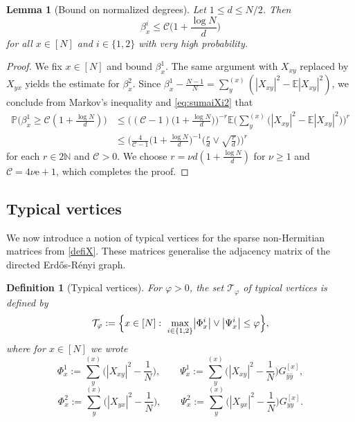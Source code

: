 \documentclass[10pt,a4paper]{amsart}
\newcommand{\ee}{\mathrm{e}}
\newcommand{\abs}[1]{\left| #1 \right|}
\newcommand{\absb}[1]{\bigl| #1 \bigr|}
\newcommand{\N}{\mathbb{N}}
\newtheorem{lemma}{Lemma}[section]
\newtheorem{defi}{Definition}[section]
\numberwithin{equation}{section}
\newcommand*\bset[1]{[#1]}
\newcommand*\ubarr[1]{{\widehat{#1}}}
\begin{document}
	\begin{lemma}[Bound on normalized degrees] \label{lem:roughboundonbetaix}
	Let $1 \leq d \leq N/2$. Then 
		\begin{equation*}
			\beta_{x}^i \le \mathcal C \biggl( 1 + \frac{\log N}{d}\biggr)
		\end{equation*}
		for all $x \in [N]$ and $i \in \{1,2\}$ with very high probability. 
	\end{lemma}
	\begin{proof}
		We fix $x \in [N]$ and bound $\beta_x^1$. The same argument with $X_{xy}$ replaced by $X_{yx}$ yields the estimate for $\beta_x^2$. 
		Since $\beta_{x}^1 - \frac{N-1}{N} = \sum_{y}^{(x)}(\abs{X_{xy}}^2 - \mathbb{E}\abs{X_{xy}}^2)$, we conclude from Markov's inequality and \cref{eq:sumaiXi2} that
		\begin{align*}
			\mathbb{P}\biggl( \beta_x^1  \ge \mathcal{C}\left(1+ \frac{\log N}{d} \right)\biggr) &\le \biggl((\mathcal{C}-1) \biggl( 1 + \frac{\log N}{d} \biggr)\biggr)^{-r} \mathbb{E}\biggl(\sum_{y}^{(x)} \bigl(\abs{X_{xy}}^2 - \mathbb{E}\abs{X_{xy}}^2\bigr) \biggr)^r \\
			&\le  \biggl(\frac{4}{\mathcal{C}-1} \biggl( 1 + \frac{\log N}{d} \biggr)^{-1} \biggl( \frac{r}{d} \vee \sqrt{\frac{r}{d}} \biggr)\biggr)^r
		\end{align*}
		for each $r \in 2\N$ and $\mathcal C >0$. 
		We choose $r = \nu d (1 + \frac{\log N}{d})$ for $\nu \geq 1$ and $\mathcal C =4 \nu \ee + 1$, which completes the proof. 
	\end{proof}
	
	
	\subsection{Typical vertices} 
	\label{sec:typical_vertices} 
	
	We now introduce a notion of typical vertices for the sparse non-Hermitian matrices from \cref{defiX}.	These matrices generalise the adjacency matrix of the directed Erd{\H o}s-R\'enyi graph.  
	
	
\begin{defi}[Typical vertices]\label{def:typicalvertices}
		For $\varphi>0$, the set $\mathcal{T}_{\varphi}$ of \textup{typical vertices} is defined by 
			\begin{equation*}
			\mathcal{T}_{\varphi} := \Bigl\{ x \in [N] :~\max_{i \in \{1,2\}}\absb{\Phi^i_x}\vee \absb{\Psi^i_x }\le \varphi\Bigr\}, 
		\end{equation*}
		where for $x \in [N]$ we wrote
		\begin{equation*}
			\Phi^1_x:= \sum_{y}^{(x)}\bigg(|X_{xy}|^2 - \frac{1}{N}\bigg), \qquad \Psi^1_x:=  \sum_{y}^{(x)}\bigg(|X_{xy}|^2 - \frac{1}{N}\bigg) G^{\bset{x}}_{\ubarr{y}\ubarr{y}},
		\end{equation*}
		\begin{equation*}
			\Phi^2_x:= \sum_{y}^{(x)}\bigg(|X_{yx}|^2 - \frac{1}{N}\bigg),\qquad \Psi^2_x:=  \sum_{y}^{(x)}\bigg(|X_{yx}|^2 - \frac{1}{N}\bigg) G^{\bset{x}}_{yy}.
		\end{equation*}
	\end{defi}
 
\end{document}
